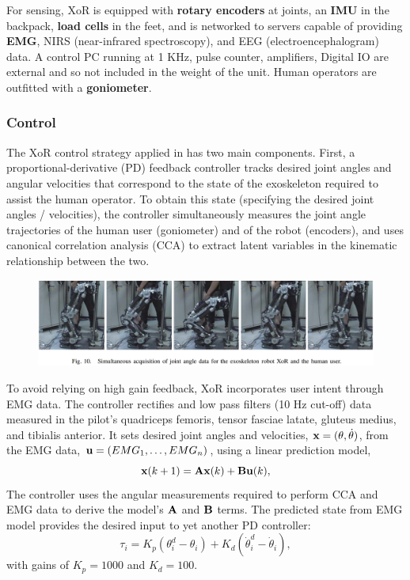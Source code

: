 \begin{refsection}
For sensing, XoR is equipped with \textbf{rotary encoders} at joints, an \textbf{IMU} in the backpack, \textbf{load cells} in the feet, and is networked to servers capable of providing \textbf{EMG}, NIRS (near-infrared spectroscopy), and EEG (electroencephalogram) data.  A control PC running at 1 KHz, pulse counter, amplifiers, Digital IO are external and so not included in the weight of the unit.  Human operators are outfitted with a \textbf{goniometer}.


\subsubsection{Control}

The XoR control strategy applied in \cite{XoRkinemExtraction2012} has two main components.  First, a proportional-derivative (PD) feedback controller tracks desired joint angles and angular velocities that correspond to the state of the exoskeleton required to assist the human operator.  To obtain this state (specifying the desired joint angles / velocities), the controller simultaneously measures the joint angle trajectories of the human user (goniometer) and of the robot (encoders), and uses canonical correlation analysis (CCA) to extract latent variables in the kinematic relationship between the two.

\begin{figure}[ht]
  \centering
  \includegraphics[width=6.0in]{exos/figs/xor_joint_angles.png}
\end{figure}

To avoid relying on high gain feedback, XoR incorporates user intent through EMG data.  The controller rectifies and low pass filters (10 Hz cut-off) data measured in the pilot's quadriceps femoris, tensor fasciae latate, gluteus medius, and tibialis anterior. 
It sets desired joint angles and velocities, ${\bf x} = ({\bf \theta}, \dot{\bf \theta})$, from the EMG data, ${\bf u} = (EMG_1, \dots , EMG_n)$, using a linear prediction model, 
\[{\bf x}(k+1) = {\bf A}{\bf x}(k)+{\bf B}{\bf u}(k),\]  
The controller uses the angular measurements required to perform CCA and EMG data to derive the model's ${\bf A}$ and ${\bf B}$ terms.  The predicted state from EMG model provides the desired input to yet another PD controller: 
\[\tau_i = K_p (\theta_i^d - \theta_i) + K_d (\dot\theta_i^d - \dot \theta_i),\] 
with gains of $K_p = 1000$ and $K_d = 100$.


\end{refsection}
